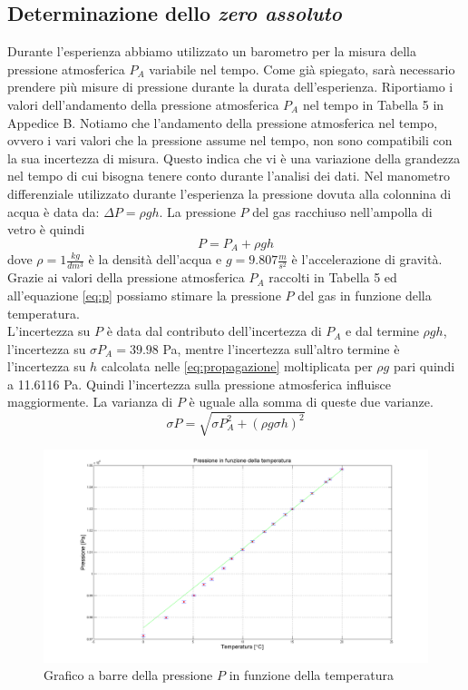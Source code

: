 \subsection{Determinazione dello \emph{zero assoluto}}
Durante l'esperienza abbiamo utilizzato un barometro per la misura della pressione atmosferica $P_A$ variabile nel tempo. 
Come già spiegato, sarà necessario prendere più misure di pressione durante la durata dell'esperienza.
Riportiamo i valori dell'andamento della pressione atmosferica $P_A$ nel tempo in Tabella 5 in Appedice B.
Notiamo che l'andamento della pressione atmosferica nel tempo, ovvero i vari valori che la pressione assume nel tempo, non sono compatibili con la sua incertezza di misura.
Questo indica che vi è una variazione della grandezza nel tempo di cui bisogna tenere conto durante l'analisi dei dati.
Nel manometro differenziale utilizzato durante l'esperienza la pressione dovuta alla colonnina di acqua è data da: $\Delta P = \rho gh$. 
La pressione $P$ del gas racchiuso nell'ampolla di vetro è quindi 
\begin{equation}
\label{eq:p}
P = P_A + \rho gh
\end{equation}
dove $\rho = 1 \frac{kg}{dm^3}$ è la densità dell'acqua e $g = 9.807 \frac{m}{s^2}$ è l'accelerazione di gravità.
Grazie ai valori della pressione atmosferica $P_A$ raccolti in Tabella 5 ed all'equazione \eqref{eq:p} possiamo stimare la pressione $P$ del gas in funzione della temperatura.\\
L'incertezza su $P$ è data dal contributo dell'incertezza di $P_A$ e dal termine $\rho gh$, l'incertezza su $\sigma P_A = 39.98$ Pa, mentre l'incertezza sull'altro termine è l'incertezza su $h$ calcolata nelle \eqref{eq:propagazione} moltiplicata per $\rho g$ pari quindi a 11.6116 Pa. 
Quindi l'incertezza sulla pressione atmosferica influisce maggiormente.
La varianza di $P$ è uguale alla somma di queste due varianze.
\begin{equation}
\sigma P = \sqrt{\sigma P_A^2 + (\rho g \sigma h)^2}
\end{equation}

\begin{figure}[H]
\centering
\includegraphics[width=\textwidth]{img/3}
\caption{Grafico a barre della pressione $P$ in funzione della temperatura}
\end{figure}


